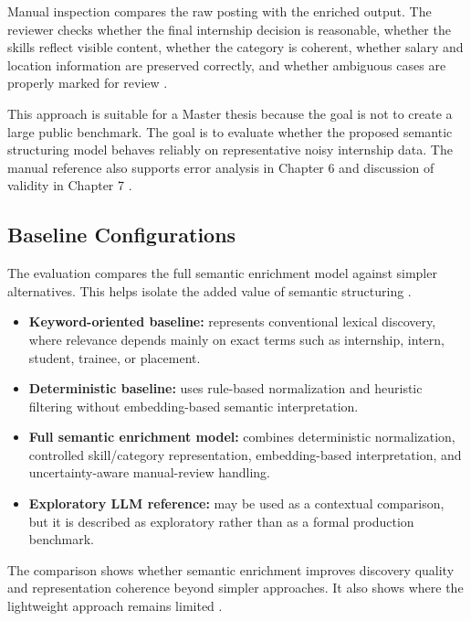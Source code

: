 Manual inspection compares the raw posting with the enriched output. The reviewer checks whether the final internship decision is reasonable, whether the skills reflect visible content, whether the category is coherent, whether salary and location information are preserved correctly, and whether ambiguous cases are properly marked for review \cite{krippendorff2004content}.

This approach is suitable for a Master thesis because the goal is not to create a large public benchmark. The goal is to evaluate whether the proposed semantic structuring model behaves reliably on representative noisy internship data. The manual reference also supports error analysis in Chapter 6 and discussion of validity in Chapter 7 \cite{wohlin2012experimentation}.

\subsection{Baseline Configurations}

The evaluation compares the full semantic enrichment model against simpler alternatives. This helps isolate the added value of semantic structuring \cite{voorhees2005trec, wohlin2012experimentation}.

\begin{itemize}
    \item \textbf{Keyword-oriented baseline:} represents conventional lexical discovery, where relevance depends mainly on exact terms such as internship, intern, student, trainee, or placement.

    \item \textbf{Deterministic baseline:} uses rule-based normalization and heuristic filtering without embedding-based semantic interpretation.

    \item \textbf{Full semantic enrichment model:} combines deterministic normalization, controlled skill/category representation, embedding-based interpretation, and uncertainty-aware manual-review handling.

    \item \textbf{Exploratory LLM reference:} may be used as a contextual comparison, but it is described as exploratory rather than as a formal production benchmark.
\end{itemize}

The comparison shows whether semantic enrichment improves discovery quality and representation coherence beyond simpler approaches. It also shows where the lightweight approach remains limited \cite{manning2008introduction, jain1991art}.

